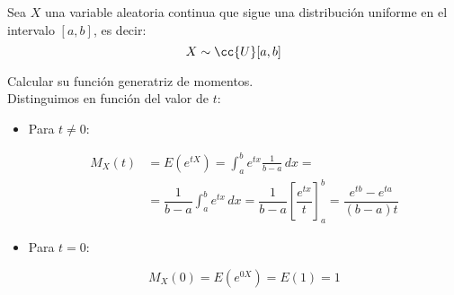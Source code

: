 \begin{ejercicio}
    Sea $X$ una variable aleatoria continua que sigue una distribución uniforme en el intervalo $[a,b]$, es decir:
    \begin{equation*}
        X\sim \cc{U}[a,b]
    \end{equation*}

    \noindent
    Calcular su función generatriz de momentos.\\

    Distinguimos en función del valor de $t$:
    \begin{itemize}
        \item Para $t\neq 0$:

        \begin{align*}
            M_X(t) &= E\left(e^{tX}\right) = \int_{a}^{b} e^{tx} \frac{1}{b-a} \, dx =\\
            &= \dfrac{1}{b-a} \int_{a}^{b} e^{tx} \, dx = \dfrac{1}{b-a} \left[ \dfrac{e^{tx}}{t} \right]_{a}^{b} =
            \dfrac{e^{tb} - e^{ta}}{(b-a)t}
        \end{align*}

        \item Para $t=0$:
        
        \begin{equation*}
            M_X(0) = E\left(e^{0X}\right) = E(1) = 1
        \end{equation*}
    \end{itemize}
\end{ejercicio}


